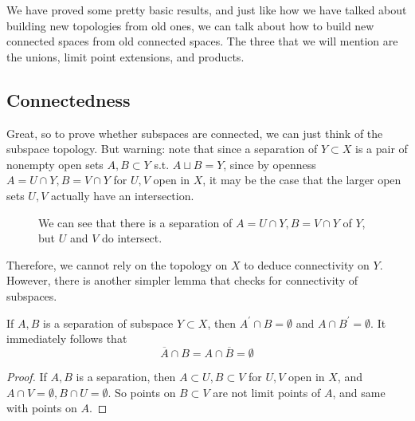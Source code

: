   We have proved some pretty basic results, and just like how we have talked about building new topologies from old ones, we can talk about how to build new connected spaces from old connected spaces. The three that we will mention are the unions, limit point extensions, and products. 

\subsection{Connectedness}

  Great, so to prove whether subspaces are connected, we can just think of the subspace topology. But warning: note that since a separation of $Y \subset X$ is a pair of nonempty open sets $A, B \subset Y$ s.t. $A \sqcup B = Y$, since by openness $A = U \cap Y, B = V \cap Y$ for $U, V$ open in $X$, it may be the case that the larger open sets $U, V$ actually have an intersection. 

  \begin{figure}[H]
    \centering 
    \caption{We can see that there is a separation of $A = U \cap Y, B = V \cap Y$ of $Y$, but $U$ and $V$ do intersect.} 
  \end{figure}

  Therefore, we cannot rely on the topology on $X$ to deduce connectivity on $Y$. However, there is another simpler lemma that checks for connectivity of subspaces. 

  \begin{lemma}
    If $A, B$ is a separation of subspace $Y \subset X$, then $A^\prime \cap B = \emptyset$ and $A \cap B^\prime = \emptyset$. It immediately follows that 
    \begin{equation}
      \overline{A} \cap B = A \cap \overline{B} = \emptyset
    \end{equation}
  \end{lemma}
  \begin{proof}
    If $A, B$ is a separation, then $A \subset U, B \subset V$ for $U, V$ open in $X$, and $A \cap V = \emptyset, B \cap U = \emptyset$. So points on $B \subset V$ are not limit points of $A$, and same with points on $A$. 
  \end{proof} 

